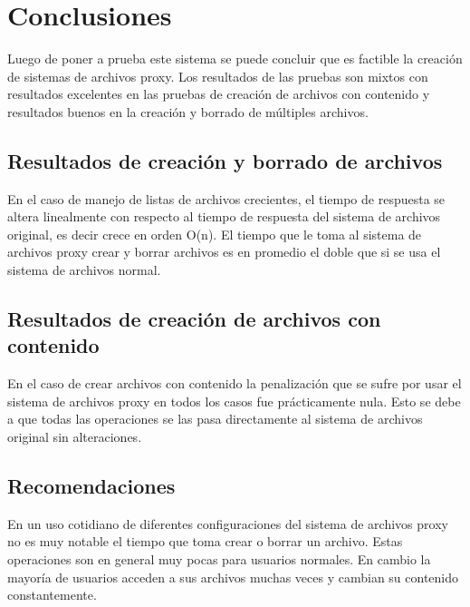 \def\baselinestretch{1}
\chapter{Conclusiones}
\ifpdf
    \graphicspath{{Conclusions/ConclusionsFigs/PNG/}{Conclusions/ConclusionsFigs/PDF/}{Conclusions/ConclusionsFigs/}}
\else
    \graphicspath{{Conclusions/ConclusionsFigs/EPS/}{Conclusions/ConclusionsFigs/}}
\fi

Luego de poner a prueba este sistema se puede concluir que es factible la creación de sistemas de archivos proxy. Los resultados de las pruebas son mixtos con resultados excelentes en las pruebas de creación de archivos con contenido y resultados buenos en la creación y borrado de múltiples archivos.

\section{Resultados de creación y borrado de archivos}

En el caso de manejo de listas de archivos crecientes, el tiempo de respuesta se altera linealmente con respecto al tiempo de respuesta del sistema de archivos original, es decir crece en orden O(n). El tiempo que le toma al sistema de archivos proxy crear y borrar archivos es en promedio el doble que si se usa el sistema de archivos normal.

\section{Resultados de creación de archivos con contenido}

En el caso de crear archivos con contenido la penalización que se sufre por usar el sistema de archivos proxy en todos los casos fue prácticamente nula. Esto se debe a que todas las operaciones se las pasa directamente al sistema de archivos original sin alteraciones.

\section{Recomendaciones}

En un uso cotidiano de diferentes configuraciones del sistema de archivos proxy no es muy notable el tiempo que toma crear o borrar un archivo. Estas operaciones son en general muy pocas para usuarios normales. En cambio la mayoría de usuarios acceden a sus archivos muchas veces y cambian su contenido constantemente. 

